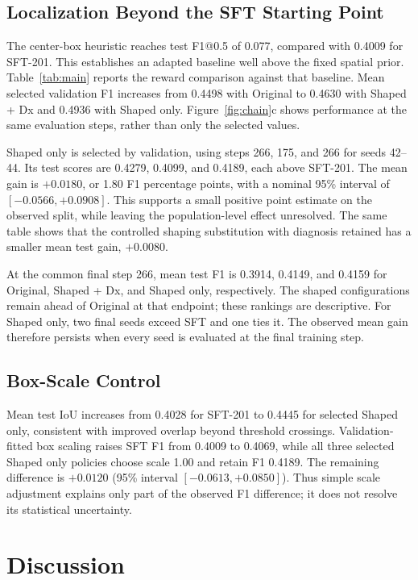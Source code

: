 \documentclass[conference]{IEEEtran}
\begin{document}
\subsection{Localization Beyond the SFT Starting Point}
The center-box heuristic reaches test F1@0.5 of 0.077, compared with 0.4009 for SFT-201. This establishes an adapted baseline well above the fixed spatial prior. Table~\ref{tab:main} reports the reward comparison against that baseline. Mean selected validation F1 increases from 0.4498 with Original to 0.4630 with Shaped + Dx and 0.4936 with Shaped only. Figure~\ref{fig:chain}c shows performance at the same evaluation steps, rather than only the selected values.

Shaped only is selected by validation, using steps 266, 175, and 266 for seeds 42--44. Its test scores are 0.4279, 0.4099, and 0.4189, each above SFT-201. The mean gain is $+0.0180$, or 1.80 F1 percentage points, with a nominal 95\% interval of $[-0.0566,+0.0908]$. This supports a small positive point estimate on the observed split, while leaving the population-level effect unresolved. The same table shows that the controlled shaping substitution with diagnosis retained has a smaller mean test gain, $+0.0080$.

At the common final step 266, mean test F1 is 0.3914, 0.4149, and 0.4159 for Original, Shaped + Dx, and Shaped only, respectively. The shaped configurations remain ahead of Original at that endpoint; these rankings are descriptive. For Shaped only, two final seeds exceed SFT and one ties it. The observed mean gain therefore persists when every seed is evaluated at the final training step.

\subsection{Box-Scale Control}
Mean test IoU increases from 0.4028 for SFT-201 to 0.4445 for selected Shaped only, consistent with improved overlap beyond threshold crossings. Validation-fitted box scaling raises SFT F1 from 0.4009 to 0.4069, while all three selected Shaped only policies choose scale 1.00 and retain F1 0.4189. The remaining difference is $+0.0120$ (95\% interval $[-0.0613,+0.0850]$). Thus simple scale adjustment explains only part of the observed F1 difference; it does not resolve its statistical uncertainty.

\section{Discussion}
\end{document}
